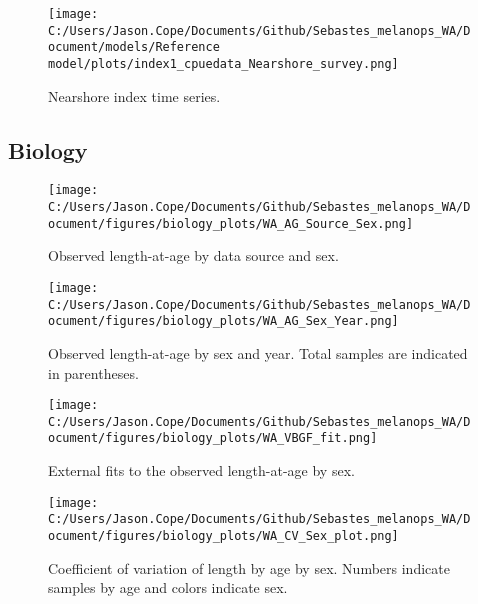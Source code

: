 \documentclass[11pt,
  english,
  letterpaper,
]{article}
\begin{document}
\begin{figure}
\centering
\texttt{[image: C:/Users/Jason.Cope/Documents/Github/Sebastes\_melanops\_WA/Document/models/Reference model/plots/index1\_cpuedata\_Nearshore\_survey.png]}
\caption{Nearshore index time series.\label{fig:nearshore-index}}
\end{figure}

\hypertarget{biology}{%
\subsection{Biology}\label{biology}}

\begin{figure}
\centering
\texttt{[image: C:/Users/Jason.Cope/Documents/Github/Sebastes\_melanops\_WA/Document/figures/biology\_plots/WA\_AG\_Source\_Sex.png]}
\caption{Observed length-at-age by data source and sex.\label{fig:len-age-data-sex}}
\end{figure}

\pagebreak

\begin{figure}
\centering
\texttt{[image: C:/Users/Jason.Cope/Documents/Github/Sebastes\_melanops\_WA/Document/figures/biology\_plots/WA\_AG\_Sex\_Year.png]}
\caption{Observed length-at-age by sex and year. Total samples are indicated in parentheses.\label{fig:len-age-sex-year}}
\end{figure}

\pagebreak

\begin{figure}
\centering
\texttt{[image: C:/Users/Jason.Cope/Documents/Github/Sebastes\_melanops\_WA/Document/figures/biology\_plots/WA\_VBGF\_fit.png]}
\caption{External fits to the observed length-at-age by sex.\label{fig:len-age-fit}}
\end{figure}

\pagebreak

\begin{figure}
\centering
\texttt{[image: C:/Users/Jason.Cope/Documents/Github/Sebastes\_melanops\_WA/Document/figures/biology\_plots/WA\_CV\_Sex\_plot.png]}
\caption{Coefficient of variation of length by age by sex. Numbers indicate samples by age and colors indicate sex.\label{fig:cv-lt-age}}
\end{figure}

\pagebreak
\end{document}
